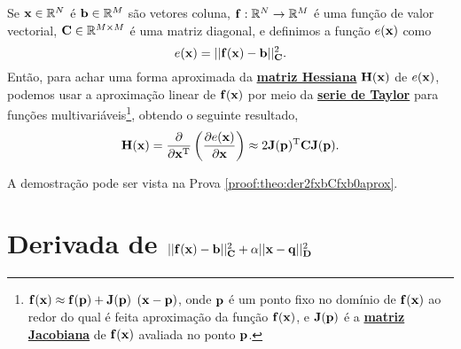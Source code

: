 \begin{theorem}\label{theo:der2fxbCfxb0aprox}
Se 
$\VECTOR{x}\in \mathbb{R}^N$ é  
$\VECTOR{b}\in \mathbb{R}^M$ são vetores coluna,  
$\VECTOR{f}: \mathbb{R}^{N}\rightarrow \mathbb{R}^{M}$ é uma função de valor vectorial,
$\MATRIX{C} \in \mathbb{R}^{M\times M}$ é uma matriz diagonal, e 
definimos a função $e(\VECTOR{x})$ como
\begin{equation}
e(\VECTOR{x})= ||\VECTOR{f}(\VECTOR{x})-\VECTOR{b}||_{\MATRIX{C}}^2.
\end{equation}
Então, para achar uma forma aproximada da \hyperref[def:hessian]{\textbf{matriz Hessiana}} $\MATRIX{H}(\VECTOR{x})$ de $e(\VECTOR{x})$, 
podemos usar a aproximação linear de $\VECTOR{f}(\VECTOR{x})$ por meio da \hyperref[def:taylor]{\textbf{serie de Taylor}} 
para funções multivariáveis\footnote{ $\VECTOR{f}(\VECTOR{x})\approx \VECTOR{f}(\VECTOR{p}) + \MATRIX{J}(\VECTOR{p})$ $\left(\VECTOR{x}-\VECTOR{p}\right)$,
onde $\VECTOR{p}$ é um ponto fixo no domínio de $\VECTOR{f}(\VECTOR{x})$ ao redor do qual é feita  aproximação
da função $\VECTOR{f}(\VECTOR{x})$,
e $\MATRIX{J}(\VECTOR{p})$ é a \hyperref[def:jacobian]{\textbf{matriz Jacobiana}} de $\VECTOR{f}(\VECTOR{x})$ avaliada no ponto $\VECTOR{p}$.}, obtendo o seguinte resultado,
\begin{equation}
\MATRIX{H}(\VECTOR{x}) = \frac{\partial}{\partial \VECTOR{x}^{\transpose}}\left(  
\frac{\partial e(\VECTOR{x}) }{\partial \VECTOR{x}} \right) \approx 
2 \MATRIX{J}(\VECTOR{p})^{\transpose}\MATRIX{C} \MATRIX{J}(\VECTOR{p}).
\end{equation}

A demostração pode ser vista na Prova \ref{proof:theo:der2fxbCfxb0aprox}.
\end{theorem}



\section{Derivada de $||\VECTOR{f}(\VECTOR{x})-\VECTOR{b}||_{\MATRIX{C}}^2+\alpha||\VECTOR{x}-\VECTOR{q}||_{\MATRIX{D}}^2$ 
}


